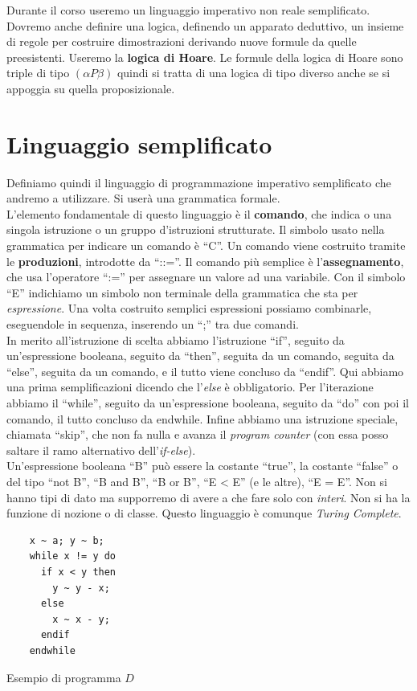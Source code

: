 Durante il corso useremo un linguaggio imperativo non reale semplificato.
Dovremo anche definire una logica, definendo un apparato deduttivo, un insieme
di regole per costruire dimostrazioni derivando nuove formule da quelle
preesistenti. Useremo la \textbf{logica di Hoare}. Le formule della logica di
Hoare sono triple di tipo $(\alpha P \beta)$ quindi si tratta di una logica di tipo diverso
anche se si appoggia su quella proposizionale.
\section{Linguaggio semplificato}
Definiamo quindi il linguaggio di programmazione imperativo semplificato che
andremo a utilizzare. Si userà una grammatica formale.\\
L'elemento fondamentale di questo linguaggio è il \textbf{comando}, che indica o
una singola istruzione o un gruppo d'istruzioni strutturate. Il simbolo usato
nella grammatica per indicare un comando è ``C''. Un comando viene costruito
tramite le \textbf{produzioni}, introdotte da ``::=''. Il comando più semplice è
l'\textbf{assegnamento}, che usa l'operatore ``:='' per assegnare un valore ad
una variabile. Con il simbolo ``E'' indichiamo un simbolo non terminale della
grammatica che sta per \textit{espressione}. Una volta costruito semplici
espressioni possiamo combinarle, eseguendole in sequenza, inserendo un ``;'' tra
due comandi.\\ 
In merito all'istruzione di scelta abbiamo l'istruzione ``if'', seguito da
un'espressione booleana, seguito da ``then'', seguita da un comando, seguita da
``else'', seguita da un comando, e il tutto viene concluso da ``endif''. Qui
abbiamo una prima semplificazioni dicendo che l'\textit{else} è
obbligatorio. Per l'iterazione abbiamo il ``while'', seguito da un'espressione
booleana, seguito da ``do'' con poi il comando, il tutto concluso da
endwhile. Infine abbiamo una istruzione speciale, chiamata ``skip'', che non fa
nulla e avanza il \textit{program counter} (con essa posso saltare il ramo
alternativo dell'\textit{if-else}).\\
Un'espressione booleana ``B'' può essere la costante ``true'', la costante
``false'' o del tipo ``not B'', ``B and B'', ``B or B'', ``E < E'' (e le altre),
``E = E''. Non si hanno tipi di dato ma supporremo di avere a che fare solo con
\textit{interi}. Non si ha la funzione di nozione o di classe. Questo linguaggio
è comunque \textit{Turing Complete}.
\begin{listing}[H]
	\begin{lstlisting}
    x ~ a; y ~ b;
    while x != y do
      if x < y then
        y ~ y - x;
      else
        x ~ x - y;
      endif
    endwhile  
	\end{lstlisting}
	\caption{Esempio di programma $D$}
	\label{listing:D}
\end{listing}
